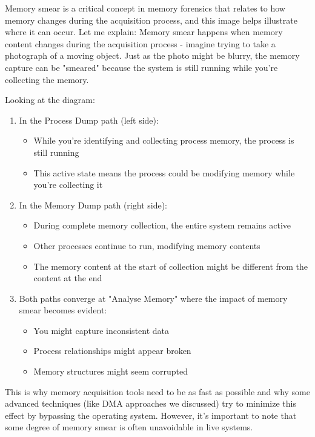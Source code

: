 Memory smear is a critical concept in memory forensics that relates to how memory changes during the acquisition process, and this image helps illustrate where it can occur. Let me explain:
Memory smear happens when memory content changes during the acquisition process - imagine trying to take a photograph of a moving object. Just as the photo might be blurry, the memory capture can be "smeared" because the system is still running while you're collecting the memory.

Looking at the diagram:
\begin{enumerate}
  \item In the Process Dump path (left side):
  \begin{itemize}
    \item While you're identifying and collecting process memory, the process is still running
    \item This active state means the process could be modifying memory while you're collecting it
  \end{itemize}
  \item In the Memory Dump path (right side):
  \begin{itemize}
    \item During complete memory collection, the entire system remains active
    \item Other processes continue to run, modifying memory contents
    \item The memory content at the start of collection might be different from the content at the end
  \end{itemize}
  \item Both paths converge at "Analyse Memory" where the impact of memory smear becomes evident:
  \begin{itemize}
    \item You might capture inconsistent data
    \item Process relationships might appear broken
    \item Memory structures might seem corrupted
  \end{itemize}
\end{enumerate}
This is why memory acquisition tools need to be as fast as possible and why some advanced techniques (like DMA approaches we discussed) try to minimize this effect by bypassing the operating system. However, it's important to note that some degree of memory smear is often unavoidable in live systems.



